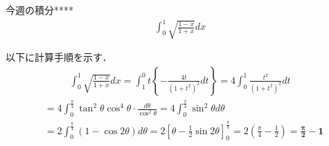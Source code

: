 \documentclass[main]{subfiles}
\begin{document}

\begin{mondai}{3}{今週の積分}{****}
    \begin{align*}
        \int_0^1 \sqrt{\frac{1-x}{1+x}} dx
    \end{align*}
\end{mondai}


\solutionhead
\hfill
以下に計算手順を示す．
\hfill\
\begin{align*}
    \int ^1_0 \sqrt{\frac{1-x}{1+x}} dx
        = \int ^0_1 t \left\{ -\frac{4t}{(1+t^2)^2}dt \right\}
        = 4 \int ^1_0 \frac{t^2}{(1+t^2)^2}dt
\end{align*}
\begin{align*}
        &= 4\int^{\frac{\pi}{4}}_0 \tan^2\theta\cos^4\theta\cdot\frac{d\theta}{\cos^2\theta}
        = 4\int^{\frac{\pi}{4}}_0 \sin^2\theta d\theta \\
        &= 2\int^{\frac{\pi}{4}}_0 \left(1-\cos 2\theta\right) d\theta
        = 2\left[ \theta-\frac{1}{2}\sin 2\theta \right]_0^{\frac{\pi}{4}}
        = 2\left( \frac{\pi}{4}-\frac{1}{2} \right)
        = \boldsymbol{\frac{\pi}{2}-1}
\end{align*}
\end{document}
